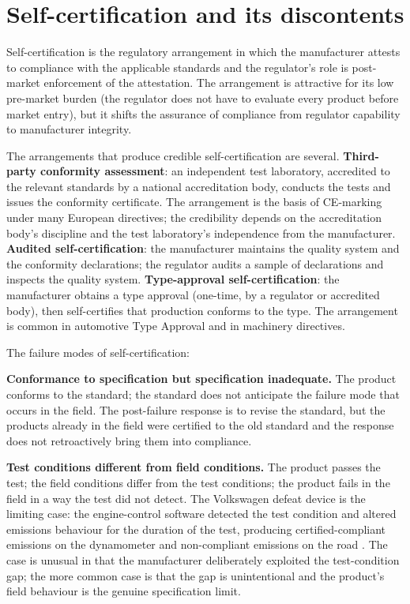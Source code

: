 \section{Self-certification and its discontents}

Self-certification is the regulatory arrangement in which the manufacturer attests to compliance with the applicable standards and the regulator's role is post-market enforcement of the attestation. The arrangement is attractive for its low pre-market burden (the regulator does not have to evaluate every product before market entry), but it shifts the assurance of compliance from regulator capability to manufacturer integrity.

The arrangements that produce credible self-certification are several. \textbf{Third-party conformity assessment}: an independent test laboratory, accredited to the relevant standards by a national accreditation body, conducts the tests and issues the conformity certificate. The arrangement is the basis of CE-marking under many European directives; the credibility depends on the accreditation body's discipline and the test laboratory's independence from the manufacturer. \textbf{Audited self-certification}: the manufacturer maintains the quality system and the conformity declarations; the regulator audits a sample of declarations and inspects the quality system. \textbf{Type-approval self-certification}: the manufacturer obtains a type approval (one-time, by a regulator or accredited body), then self-certifies that production conforms to the type. The arrangement is common in automotive Type Approval and in machinery directives.

The failure modes of self-certification:

\textbf{Conformance to specification but specification inadequate.} The product conforms to the standard; the standard does not anticipate the failure mode that occurs in the field. The post-failure response is to revise the standard, but the products already in the field were certified to the old standard and the response does not retroactively bring them into compliance.

\textbf{Test conditions different from field conditions.} The product passes the test; the field conditions differ from the test conditions; the product fails in the field in a way the test did not detect. The Volkswagen defeat device is the limiting case: the engine-control software detected the test condition and altered emissions behaviour for the duration of the test, producing certified-compliant emissions on the dynamometer and non-compliant emissions on the road \cite{acc:epa-vw-nov-2015}. The case is unusual in that the manufacturer deliberately exploited the test-condition gap; the more common case is that the gap is unintentional and the product's field behaviour is the genuine specification limit.

